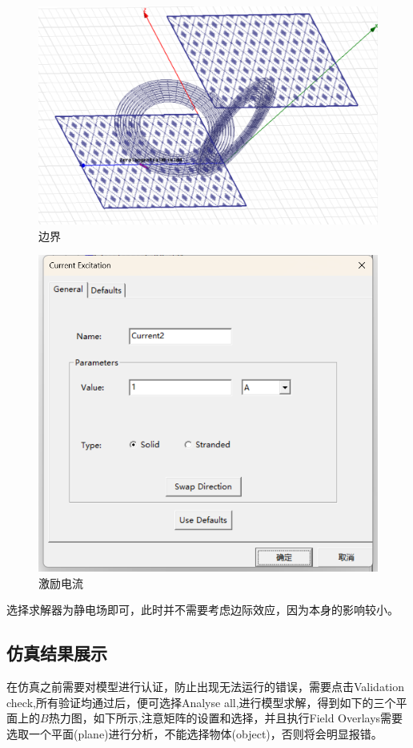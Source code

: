 \documentclass{article}
\begin{document}
\begin{figure}[h]
  \centering
  \includegraphics[scale=0.18]{procedure/bounder.png}
  \caption{边界}
  \label{fig:example}
\end{figure}\textbf{}

\begin{figure}[h]
  \centering
  \includegraphics[scale=0.2]{procedure/current.png}
  \caption{激励电流}
  \label{fig:example}
\end{figure}\textbf{}

选择求解器为静电场即可，此时并不需要考虑边际效应，因为本身的影响较小。


\subsection{仿真结果展示}
在仿真之前需要对模型进行认证，防止出现无法运行的错误，需要点击Validation check,所有验证均通过后，便可选择Analyse all,进行模型求解，得到如下的三个平面上的$B$热力图，如下所示,注意矩阵的设置和选择，并且执行Field Overlays需要选取一个平面(plane)进行分析，不能选择物体(object)，否则将会明显报错。
\end{document}
